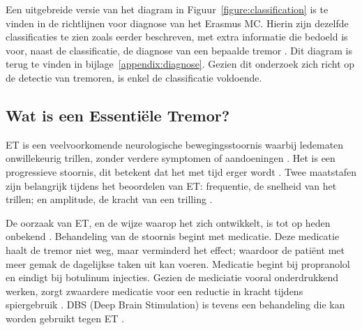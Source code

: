 Een uitgebreide versie van het diagram in Figuur~\ref{figure:classification}
is te vinden in de richtlijnen voor diagnose van het Erasmus MC.
Hierin zijn dezelfde classificaties te zien zoals eerder beschreven, 
met extra informatie die bedoeld is voor, naast de classificatie, de diagnose van een bepaalde tremor \cite{erasmus2022}.
Dit diagram is terug te vinden in bijlage~\ref{appendix:diagnose}.
Gezien dit onderzoek zich richt op de detectie van tremoren, is enkel de classificatie voldoende.

\subsection{Wat is een Essentiële Tremor?}

ET is een veelvoorkomende neurologische bewegingsstoornis waarbij ledematen onwillekeurig trillen,
zonder verdere symptomen of aandoeningen \cite{erasmus2022,frontiers2022}.
Het is een progressieve stoornis, dit betekent dat het met tijd erger wordt \cite{elsevier2022}.
Twee maatstafen zijn belangrijk tijdens het beoordelen van ET: frequentie, de snelheid van het trillen;
en amplitude, de kracht van een trilling \cite{elsevier2022,frontiers2022}.

De oorzaak van ET, en de wijze waarop het zich ontwikkelt, is tot op heden onbekend \cite{erasmus2022,elsevier2022,frontiers2022}.
Behandeling van de stoornis begint met medicatie. Deze medicatie haalt de tremor niet weg,
maar verminderd het effect; waardoor de patiënt met meer gemak de dagelijkse taken uit kan voeren.
Medicatie begint bij propranolol en eindigt bij botulinum injecties.
Gezien de mediciatie vooral onderdrukkend werken,
zorgt zwaardere medicatie voor een reductie in kracht tijdens spiergebruik \cite{erasmus2022,elsevier2022,sips2024}.
DBS (Deep Brain Stimulation) is tevens een behandeling die kan worden gebruikt tegen ET \cite{erasmus2022,elsevier2022,sips2024}.
